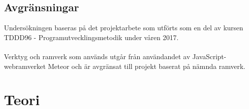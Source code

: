 

\subsection{Avgränsningar}
\label{sec:joakim-delimitations}

Undersökningen baseras på det projektarbete som utförts som en del av kursen TDDD96 - Programutvecklingsmetodik under våren 2017.\\
\\
Verktyg och ramverk som används utgår från användandet av JavaScript-webramverket Meteor och är avgränsat till projekt baserat på nämnda ramverk.  







\section{Teori}
\label{cha:joakim-theory}

